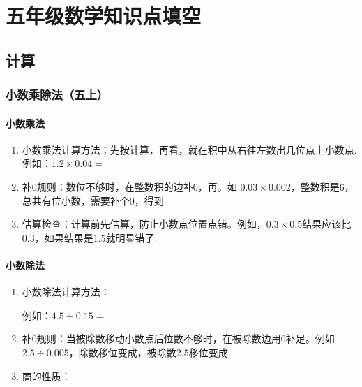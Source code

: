 \chapter*{五年级数学知识点填空}
\section*{计算}
\subsection*{小数乘除法（五上）}
\subsubsection*{小数乘法}
\begin{enumerate}
    \item 小数乘法计算方法：先按计算，再看，就在积中从右往左数出几位点上小数点. 例如：$1.2 \times 0.04 = $

    \item 补0规则：数位不够时，在整数积的边补0，再。如 $0.03\times0.002$，整数积是6，总共有位小数，需要补个0，得到

    \item 估算检查：计算前先估算，防止小数点位置点错。例如，$0.3 \times 0.5$结果应该比$0.3$，如果结果是$1.5$就明显错了.
\end{enumerate}

\subsubsection*{小数除法}
\begin{enumerate}
    \item 小数除法计算方法：
    例如：$4.5 \div 0.15 = $

    \item 补0规则：当被除数移动小数点后位数不够时，在被除数边用0补足。例如 $2.5 \div 0.005$，除数移位变成，被除数$2.5$移位变成.
    
    \item 商的性质：
\end{enumerate}

